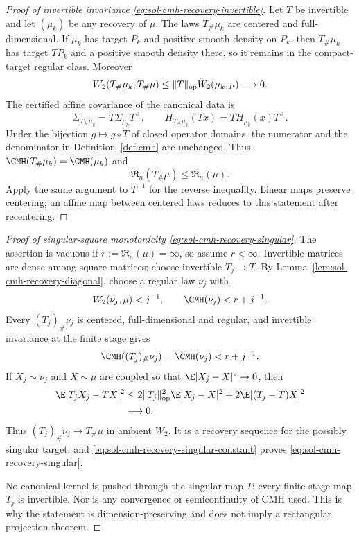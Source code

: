 \documentclass[../main.tex]{subfiles}
\begin{document}
\begin{proof}[Proof of invertible invariance \eqref{eq:sol-cmh-recovery-invertible}]
Let $T$ be invertible and let $(\mu_k)$ be any recovery of $\mu$.  The laws $T_\#\mu_k$ are
centered and full-dimensional.  If $\mu_k$ has target $P_k$ and positive smooth density on
$P_k$, then $T_\#\mu_k$ has target $TP_k$ and a positive smooth density there, so it remains in
the compact-target regular class.  Moreover
\[
  W_2(T_\#\mu_k,T_\#\mu)\le\lVert T\rVert_{\rm op}W_2(\mu_k,\mu)\longrightarrow0.
\]
The certified affine covariance of the canonical data is
\[
  \Sigma_{T_\#\mu_k}=T\Sigma_{\mu_k}T^\top,
  \qquad
  H_{T_\#\mu_k}(Tx)=T H_{\mu_k}(x)T^\top.
\]
Under the bijection $g\mapsto g\circ T$ of closed operator domains, the numerator and the
denominator in Definition~\ref{def:cmh} are unchanged.  Thus
$\CMH(T_\#\mu_k)=\CMH(\mu_k)$ and
\[
  \mathfrak R_n(T_\#\mu)\le\mathfrak R_n(\mu).
\]
Apply the same argument to $T^{-1}$ for the reverse inequality.  Linear maps preserve
centering; an affine map between centered laws reduces to this statement after recentering.
\end{proof}

\begin{proof}[Proof of singular-square monotonicity \eqref{eq:sol-cmh-recovery-singular}]
The assertion is vacuous if $r:=\mathfrak R_n(\mu)=\infty$, so assume $r<\infty$.  Invertible
matrices are dense among square matrices; choose invertible $T_j\to T$.  By
Lemma~\ref{lem:sol-cmh-recovery-diagonal}, choose a regular law $\nu_j$ with
\begin{equation}
  W_2(\nu_j,\mu)<j^{-1},
  \qquad
  \CMH(\nu_j)<r+j^{-1}.
  \label{eq:sol-cmh-recovery-singular-diagonal}
\end{equation}
Every $(T_j)_\#\nu_j$ is centered, full-dimensional and regular, and invertible invariance at
the finite stage gives
\begin{equation}
  \CMH((T_j)_\#\nu_j)=\CMH(\nu_j)<r+j^{-1}.
  \label{eq:sol-cmh-recovery-singular-constant}
\end{equation}
If $X_j\sim\nu_j$ and $X\sim\mu$ are coupled so that
$\E\lvert X_j-X\rvert^2\to0$, then
\begin{align*}
  \E\lvert T_jX_j-TX\rvert^2
  &\le2\lVert T_j\rVert_{\rm op}^2\E\lvert X_j-X\rvert^2
       +2\E\lvert(T_j-T)X\rvert^2\\
  &\longrightarrow0.
\end{align*}
Thus $(T_j)_\#\nu_j\to T_\#\mu$ in ambient $W_2$.  It is a recovery sequence for the
possibly singular target, and \eqref{eq:sol-cmh-recovery-singular-constant} proves
\eqref{eq:sol-cmh-recovery-singular}.

No canonical kernel is pushed through the singular map $T$: every finite-stage map $T_j$ is
invertible.  Nor is any convergence or semicontinuity of CMH used.  This is why the statement
is dimension-preserving and does not imply a rectangular projection theorem.
\end{proof}
\end{document}
